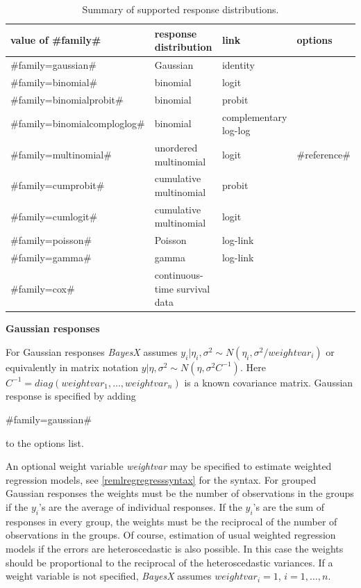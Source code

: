 \begin{table}[ht]
\begin{center}
\begin{tabular} {|l|l|p{2.7cm}|l|}
 \hline
 value of #family# & response distribution & link & options\\
 \hline
 \hline
 #family=gaussian#            & Gaussian              & identity & \\
 \hline
 #family=binomial#            & binomial              & logit & \\
 #family=binomialprobit#      & binomial              & probit & \\
 #family=binomialcomploglog#      & binomial              & complementary log-log & \\
 \hline
 #family=multinomial#         & unordered multinomial & logit & #reference#\\
 \hline
 #family=cumprobit#           & cumulative multinomial   & probit & \\
 #family=cumlogit#            & cumulative multinomial   & logit & \\
 \hline
 #family=poisson#             & Poisson               & log-link & \\
 \hline
 #family=gamma#               & gamma                 & log-link & \\
 \hline
 #family=cox#                 & continuous-time survival data & & \\
 \hline
\end{tabular}
{\em \caption {\label{remlregfamilyopt} Summary of supported
response distributions.}}
\end{center}
\end{table}

{\bf Gaussian responses}

For Gaussian responses {\em BayesX} assumes $y_i | \eta_i,\sigma^2
\sim N(\eta_i,\sigma^2/weightvar_i)$ or equivalently in matrix
notation $y | \eta, \sigma^2 \sim N(\eta,\sigma^2C^{-1})$. Here
$C^{-1}=diag(weightvar_1,\dots,weightvar_n)$ is a known covariance
matrix. Gaussian response is specified by adding

#family=gaussian#

to the options list.

An optional weight variable {\em weightvar} may be specified to
estimate weighted regression models, see
\autoref{remlregregresssyntax} for the syntax. For grouped
Gaussian responses the weights must be the number of observations
in the groups if the $y_i$'s are the average of individual
responses. If the $y_i$'s are the sum of responses in every group,
the weights must be the reciprocal of the number of observations
in the groups. Of course, estimation of usual weighted regression
models if the errors are heteroscedastic is also possible. In this
case the weights should be proportional to the reciprocal of the
heteroscedastic variances. If a weight variable is not specified,
{\em BayesX} assumes $weightvar_i = 1$, $i=1,\dots,n$.

